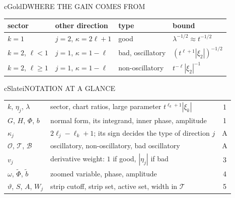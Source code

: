 \documentclass[10pt]{article}
\newcommand{\cO}{\mathcal{O}}
\newcommand{\cT}{\mathcal{T}}
\newcommand{\cB}{\mathcal{B}}
\begin{document}
\begin{minipage}[t][49.0cm][t]{0.322\textwidth}
\begin{panel}{cGold}{D}{WHERE THE GAIN COMES FROM}
{\small
\begin{tabular}{@{}p{2.2cm}p{2.6cm}p{2.5cm}l@{}}
\textbf{\color{cGold}sector} & \textbf{\color{cGold}other direction} & \textbf{\color{cGold}type} & \textbf{\color{cGold}bound}\\\hline
$k=1$ & $j=2$, $\kappa=2\ell+1$ & good & $\lambda^{-1/2}\approx t^{-1/2}$\\
$k=2$, $\ell<1$ & $j=1$, $\kappa=1-\ell$ & bad, oscillatory & $(t^{\ell+1}|\xi_2|)^{-1/2}$\\
\rowcolor{cGold!12}$k=2$, $\ell\ge1$ & $j=1$, $\kappa=1-\ell$ & non-oscillatory & $t^{-\ell}|\xi_2|^{-1}$\\
\end{tabular}}
\end{panel}
\vfill
\begin{panel}{cSlate}{i}{NOTATION AT A GLANCE}
{\small
\begin{tabular}{@{}p{2.9cm}p{7.2cm}c@{}}
$k$, $\eta_j$, $\lambda$ & sector, chart ratios, large parameter $t^{\ell_k+1}|\xi_k|$ & 1\\
$G$, $H$, $\Phi$, $b$ & normal form, its integrand, inner phase, amplitude & 1\\
$\kappa_j$ & $2\ell_j-\ell_k+1$; its sign decides the type of direction $j$ & A\\
$\cO$, $\cT$, $\cB$ & oscillatory, non-oscillatory, bad oscillatory & A\\
$v_j$ & derivative weight: $1$ if good, $|\eta_j|$ if bad & 3\\
$\omega$, $\tilde\Phi$, $\tilde b$ & zoomed variable, phase, amplitude & 4\\
$\vartheta$, $S$, $A$, $W_j$ & strip cutoff, strip set, active set, width in $\cT$ & 5\\
\end{tabular}}
\end{panel}

\end{minipage}
\end{document}
